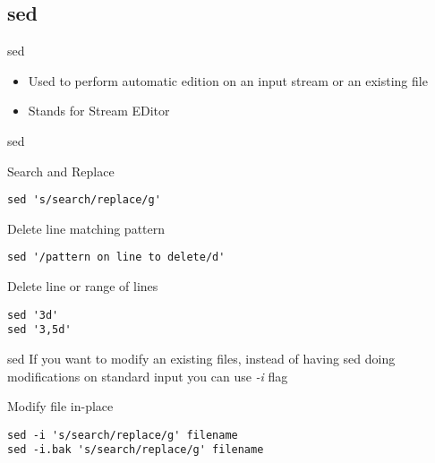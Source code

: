 \subsection{sed}

\begin{frame}[fragile]{sed}
  \begin{itemize}
    \item Used to perform automatic edition on an input stream or an existing file
    \pause
    \item Stands for Stream EDitor
  \end{itemize}
\end{frame}

\begin{frame}[fragile]{sed}
  \begin{exampleblock}{Search and Replace}
    \begin{lstlisting}[showstringspaces=false]
sed 's/search/replace/g'
    \end{lstlisting}
  \end{exampleblock}
  \pause

  \begin{exampleblock}{Delete line matching pattern}
    \begin{lstlisting}[showstringspaces=false]
sed '/pattern on line to delete/d'
    \end{lstlisting}
  \end{exampleblock}
  \pause

  \begin{exampleblock}{Delete line or range of lines}
    \begin{lstlisting}[showstringspaces=false]
sed '3d'
sed '3,5d'
    \end{lstlisting}
  \end{exampleblock}
\end{frame}

\begin{frame}[fragile]{sed}
If you want to modify an existing files, instead of having sed doing modifications on standard input you can use \emph{-i} flag
\pause
  \begin{exampleblock}{Modify file in-place}
    \begin{lstlisting}[showstringspaces=false]
sed -i 's/search/replace/g' filename
sed -i.bak 's/search/replace/g' filename
    \end{lstlisting}
  \end{exampleblock}
\end{frame}

